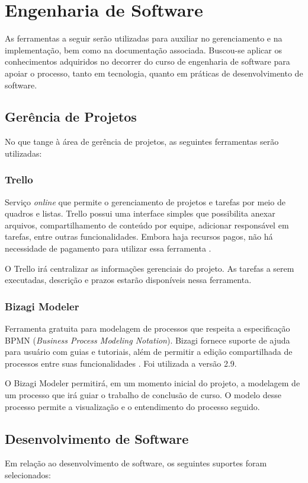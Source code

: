 \section{Engenharia de Software}
As ferramentas a seguir serão utilizadas para auxiliar no gerenciamento e na implementação, bem como na documentação associada. Buscou-se aplicar os conhecimentos adquiridos no decorrer do curso de engenharia de software para apoiar o processo, tanto em tecnologia, quanto em práticas de desenvolvimento de software.

\subsection{Gerência de Projetos}
No que tange à área de gerência de projetos, as seguintes ferramentas serão utilizadas:

\subsubsection{Trello} 
Serviço \textit{online} que permite o gerenciamento de projetos e tarefas por meio de quadros e listas. Trello possui uma interface simples que possibilita anexar arquivos, compartilhamento de conteúdo por equipe, adicionar responsável em tarefas,  entre outras funcionalidades. Embora haja recursos pagos, não há necessidade de pagamento para utilizar essa ferramenta \cite{trello2015}.
\par
\indent O Trello irá centralizar as informações gerenciais do projeto. As tarefas a serem executadas, descrição e prazos estarão disponíveis nessa ferramenta.

\subsubsection{Bizagi Modeler}
Ferramenta gratuita para modelagem de processos que respeita a especificação BPMN (\textit{Business Process Modeling Notation}). Bizagi fornece suporte de ajuda para usuário com guias e tutoriais, além de permitir a edição compartilhada de processos entre suas funcionalidades \cite{bizagi2015}. Foi utilizada a versão 2.9.
\par
\indent O Bizagi Modeler permitirá, em um momento inicial do projeto, a modelagem de um processo que irá guiar o trabalho de conclusão de curso. O modelo desse processo permite a visualização e o entendimento do processo seguido.

\subsection{Desenvolvimento de Software}
Em relação ao desenvolvimento de software, os seguintes suportes foram selecionados:

